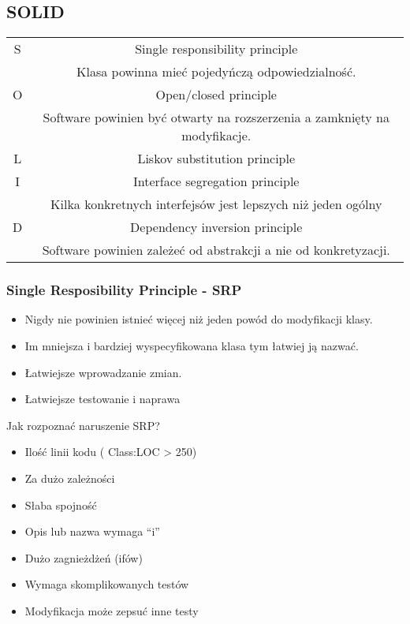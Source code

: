 \documentclass[a4paper]{article}
\begin{document}
\subsection{SOLID}


\begin{tabular}{|c|c|}
    \hline
S & Single responsibility principle\\
& Klasa powinna mieć pojedyńczą
odpowiedzialność.\\
\hline
O & Open/closed principle\\
& Software powinien być otwarty na
rozszerzenia a zamknięty na modyfikacje.\\
    \hline
L & Liskov substitution principle\\
    \hline
I & Interface segregation principle\\
& Kilka konkretnych interfejsów jest lepszych
niż jeden ogólny\\
    \hline
D & Dependency inversion principle\\
& Software powinien zależeć od abstrakcji a
nie od konkretyzacji.\\
    \hline
\end{tabular}

\subsubsection{Single Resposibility Principle - SRP}
\begin{itemize}
    \item Nigdy nie powinien istnieć więcej niż jeden powód do modyfikacji klasy.
    \item Im mniejsza i bardziej wyspecyfikowana klasa tym łatwiej ją nazwać.
    \item Łatwiejsze wprowadzanie zmian.
    \item Łatwiejsze testowanie i naprawa
\end{itemize}

    Jak rozpoznać naruszenie SRP?
    \begin{itemize}
        \item Ilość linii kodu ( Class:LOC > 250)
        \item Za dużo
        zależności
        \item Słaba spojność
        \item Opis lub nazwa wymaga “i”
        \item Dużo zagnieżdżeń (ifów)
        \item Wymaga skomplikowanych testów
        \item Modyfikacja może zepsuć inne testy
    \end{itemize}
\end{document}
